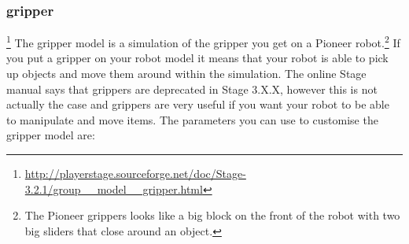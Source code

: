 \documentclass[a4paper]{report}
\begin{document}
\subsubsection{gripper}\footnote{\url{http://playerstage.sourceforge.net/doc/Stage-3.2.1/group__model__gripper.html}}\label{sec:BuildingAWorld:BuildingRobot:RobotSensors:Gripper}
The gripper model is a simulation of the gripper you get on a Pioneer robot.\footnote{The Pioneer grippers looks like a big block on the front of the robot with two big sliders that close around an object.} If you put a gripper on your robot model it means that your robot is able to pick up objects and move them around within the simulation. The online Stage manual says that grippers are deprecated in Stage 3.X.X, however this is not actually the case and grippers are very useful if you want your robot to be able to manipulate and move items. The parameters you can use to customise the gripper model are:
\end{document}
